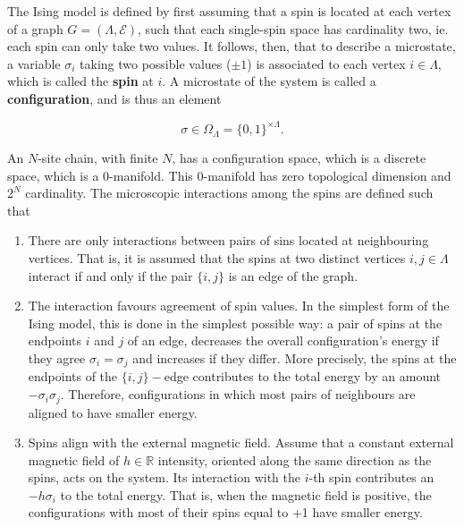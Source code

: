 \documentclass{homework}
\begin{document}
The Ising model is defined by first assuming that a spin is located at each vertex of a graph $G = (\Lambda, \mathcal{E})$, such that each single-spin space has cardinality two, ie. each spin can only take two values. It follows, then, that to describe a microstate, a variable $\sigma_i$ taking two possible values ($\pm1$) is associated to each vertex $i \in \Lambda$, which is called the \textbf{spin} at $i$. A microstate of the system is called a \textbf{configuration}, and is thus an element

$$
    \sigma \in \Omega_{\Lambda} = \{0, 1\}^{\times \Lambda}.
$$

An $N$-site chain, with finite $N$, has a configuration space, which is a discrete space, which is a 0-manifold. This 0-manifold has zero topological dimension and $2^N$ cardinality. The microscopic interactions among the spins are defined such that 

\begin{enumerate}
    \item There are only interactions between pairs of sins located at neighbouring vertices. That is, it is assumed that the spins at two distinct vertices $i, j \in \Lambda$ interact if and only if the pair $\{i, j\}$ is an edge of the graph. \\
    
    \item The interaction favours agreement of spin values. In the simplest form of the Ising model, this is done in the simplest possible way: a pair of spins at the endpoints $i$ and $j$ of an edge, decreases the overall configuration's energy if they agree $\sigma_i = \sigma_j$ and increases if they differ. More precisely, the spins at the endpoints of the $\{i,j\}-$edge contributes to the total energy by an amount $
        - \sigma_i \sigma_j.$ Therefore, configurations in which most pairs of neighbours are aligned to have smaller energy. \\
    
    \item Spins align with the external magnetic field. Assume that a constant external magnetic field of $h \in \mathds{R}$ intensity, oriented along the same direction as the spins, acts on the system. Its interaction with the $i$-th spin contributes an     $
        -h \sigma_i $ to the total energy. That is, when the magnetic field is positive, the configurations with most of their spins equal to +1 have smaller energy. \\
\end{enumerate}
\end{document}
